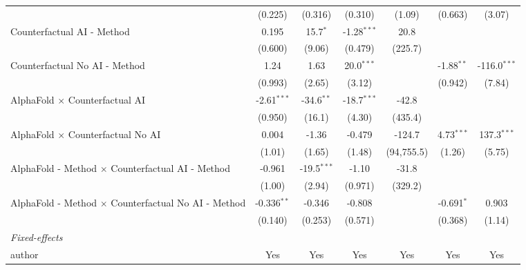 \begin{tabular}{lcccccc}
                                                              & (0.225)       & (0.316)       & (0.310)       & (1.09)     & (0.663)      & (3.07)\\   
   Counterfactual AI - Method                                 & 0.195         & 15.7$^{*}$    & -1.28$^{***}$ & 20.8       &              &   \\   
                                                              & (0.600)       & (9.06)        & (0.479)       & (225.7)    &              &   \\   
   Counterfactual No AI - Method                              & 1.24          & 1.63          & 20.0$^{***}$  &            & -1.88$^{**}$ & -116.0$^{***}$\\   
                                                              & (0.993)       & (2.65)        & (3.12)        &            & (0.942)      & (7.84)\\   
   AlphaFold $\times$ Counterfactual AI                       & -2.61$^{***}$ & -34.6$^{**}$  & -18.7$^{***}$ & -42.8      &              &   \\   
                                                              & (0.950)       & (16.1)        & (4.30)        & (435.4)    &              &   \\   
   AlphaFold $\times$ Counterfactual No AI                    & 0.004         & -1.36         & -0.479        & -124.7     & 4.73$^{***}$ & 137.3$^{***}$\\   
                                                              & (1.01)        & (1.65)        & (1.48)        & (94,755.5) & (1.26)       & (5.75)\\   
   AlphaFold - Method $\times$ Counterfactual AI - Method     & -0.961        & -19.5$^{***}$ & -1.10         & -31.8      &              &   \\   
                                                              & (1.00)        & (2.94)        & (0.971)       & (329.2)    &              &   \\   
   AlphaFold - Method $\times$ Counterfactual No AI - Method  & -0.336$^{**}$ & -0.346        & -0.808        &            & -0.691$^{*}$ & 0.903\\   
                                                              & (0.140)       & (0.253)       & (0.571)       &            & (0.368)      & (1.14)\\   
   \midrule
   \emph{Fixed-effects}\\
   author                                                     & Yes           & Yes           & Yes           & Yes        & Yes          & Yes\\  

\end{tabular}

